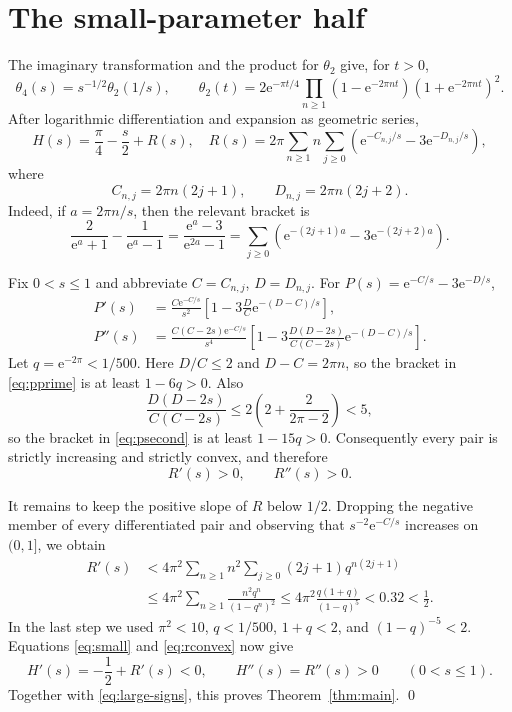 \documentclass[11pt,a4paper]{article}
\newcommand{\e}{\mathrm e}
\newcommand{\thfour}{\theta_4}
\begin{document}
\section*{The small-parameter half}
The imaginary transformation and the product for $\theta_2$ give, for
$t>0$,
\[
 \thfour(s)=s^{-1/2}\theta_2(1/s),\qquad
 \theta_2(t)=2\e^{-\pi t/4}\prod_{n\geq1}
 (1-\e^{-2\pi nt})(1+\e^{-2\pi nt})^2.
\]
After logarithmic differentiation and expansion as geometric series,
\begin{equation}\label{eq:small}
 H(s)=\frac{\pi}{4}-\frac{s}{2}+R(s),
 \quad
 R(s)=2\pi\sum_{n\geq1}n\sum_{j\geq0}
 \left(\e^{-C_{n,j}/s}-3\e^{-D_{n,j}/s}\right),
\end{equation}
where
\[
 C_{n,j}=2\pi n(2j+1),\qquad D_{n,j}=2\pi n(2j+2).
\]
Indeed, if $a=2\pi n/s$, then the relevant bracket is
\[
 \frac{2}{\e^a+1}-\frac{1}{\e^a-1}
 =\frac{\e^a-3}{\e^{2a}-1}
 =\sum_{j\geq0}\left(\e^{-(2j+1)a}-3\e^{-(2j+2)a}\right).
\]

Fix $0<s\leq1$ and abbreviate $C=C_{n,j}$, $D=D_{n,j}$.
For $P(s)=\e^{-C/s}-3\e^{-D/s}$,
\begin{align}
 P'(s)&=\frac{C\e^{-C/s}}{s^2}
 \left[1-3\frac DC\e^{-(D-C)/s}\right],\label{eq:pprime}\\
 P''(s)&=\frac{C(C-2s)\e^{-C/s}}{s^4}
 \left[1-3\frac{D(D-2s)}{C(C-2s)}
 \e^{-(D-C)/s}\right].\label{eq:psecond}
\end{align}
Let $q=\e^{-2\pi}<1/500$.  Here $D/C\leq2$ and $D-C=2\pi n$,
so the bracket in \eqref{eq:pprime} is at least $1-6q>0$.
Also
\[
 \frac{D(D-2s)}{C(C-2s)}
 \leq2\left(2+\frac{2}{2\pi-2}\right)<5,
\]
so the bracket in \eqref{eq:psecond} is at least $1-15q>0$.
Consequently every pair is strictly increasing and strictly convex, and
therefore
\begin{equation}\label{eq:rconvex}
 R'(s)>0,\qquad R''(s)>0.
\end{equation}

It remains to keep the positive slope of $R$ below $1/2$.  Dropping the
negative member of every differentiated pair and observing that
$s^{-2}\e^{-C/s}$ increases on $(0,1]$, we obtain
\begin{align*}
 R'(s)
 &<4\pi^2\sum_{n\geq1}n^2\sum_{j\geq0}(2j+1)
 q^{n(2j+1)}\\
 &\leq4\pi^2\sum_{n\geq1}\frac{n^2q^n}{(1-q^n)^2}
 \leq4\pi^2\frac{q(1+q)}{(1-q)^5}<0.32<\frac12.
\end{align*}
In the last step we used $\pi^2<10$, $q<1/500$, $1+q<2$, and
$(1-q)^{-5}<2$.  Equations \eqref{eq:small} and \eqref{eq:rconvex} now give
\[
 H'(s)=-\frac12+R'(s)<0,
 \qquad H''(s)=R''(s)>0
 \qquad(0<s\leq1).
\]
Together with \eqref{eq:large-signs}, this proves
Theorem~\ref{thm:main}. \qed
\end{document}
